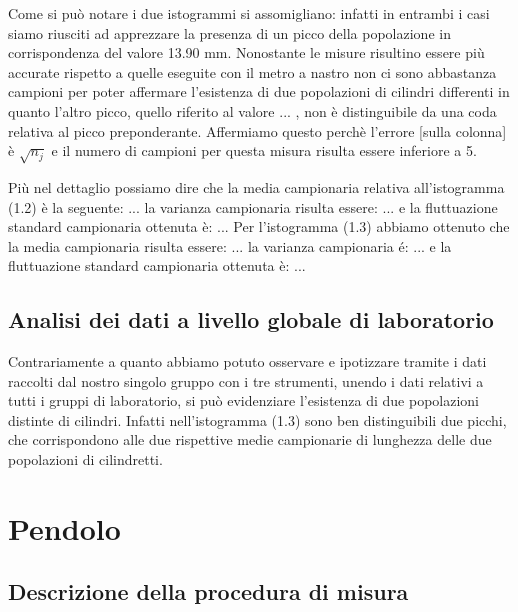 \documentclass[12pt, twoside, a4paper]{article}
\begin{document}
Come si può notare i due istogrammi si assomigliano: infatti in entrambi i casi siamo riusciti ad apprezzare la presenza di un picco della popolazione in corrispondenza del valore 13.90 mm. Nonostante le misure risultino essere più accurate rispetto a quelle eseguite con il metro a nastro non ci sono abbastanza campioni per poter affermare l'esistenza di due popolazioni di cilindri differenti in quanto l'altro picco, quello riferito al valore ... , non è distinguibile da una coda relativa al picco preponderante. Affermiamo questo perchè l'errore [sulla colonna] è $\sqrt{n_j}$ e il numero di campioni per questa misura risulta essere inferiore a 5.

Più nel dettaglio possiamo dire che la media campionaria relativa all'istogramma (1.2) è la seguente: ...
la varianza campionaria risulta essere: ... e la fluttuazione standard campionaria ottenuta è: ...
Per l'istogramma (1.3) abbiamo ottenuto che la media campionaria risulta essere: ... la varianza campionaria é: ... e la fluttuazione standard campionaria ottenuta è: ...
	\subsection{Analisi dei dati a livello globale di laboratorio}
Contrariamente a quanto abbiamo potuto osservare e ipotizzare tramite i dati raccolti dal nostro singolo gruppo con i tre strumenti, unendo i dati relativi a tutti i gruppi di laboratorio, si può evidenziare l'esistenza di due popolazioni distinte di cilindri. Infatti nell'istogramma (1.3) sono ben distinguibili due picchi, che corrispondono alle due rispettive medie campionarie di lunghezza delle due popolazioni di cilindretti.

\newpage

\section{Pendolo}
	\subsection{Descrizione della procedura di misura}
\end{document}
